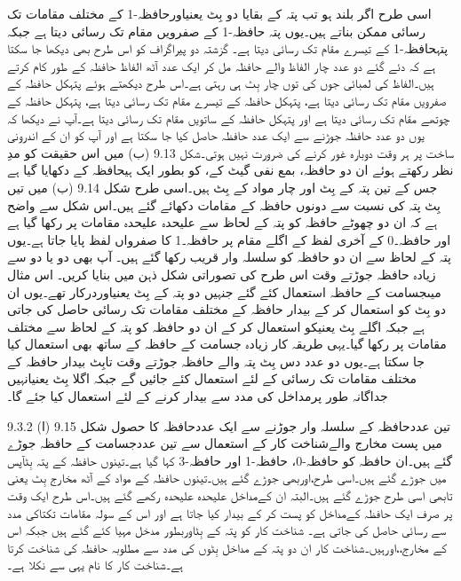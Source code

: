 	اسی طرح اگر بلند ہو تب پتہ کے بقایا دو بِٹ یعنیاورحافظہ-1 کے مختلف مقامات تک رسائی ممکن بناتے ہیں۔یوں پتہ حافظہ-1 کے صفرویں مقام تک رسائی دیتا ہے جبکہ پتہحافظہ-1 کے تیسرے مقام تک رسائی دیتا ہے۔
	گزشتہ دو پیراگراف کو اس طرح بھی دیکھا جا سکتا ہے کہ دئے گئے دو عدد چار الفاظ والے حافظہ مل کر ایک عدد آٹھ الفاظ حافظہ کے طور کام کرتے ہیں۔الفاظ کی لمبائی جوں کی توں چار بِٹ ہی رہتی ہے۔اس طرح دیکھتے ہوئے پتہکل حافظہ کے صفرویں مقام تک رسائی دیتا ہے، پتہکل حافظہ کے تیسرے مقام تک رسائی دیتا ہے، پتہکل حافظہ کے چوتھے مقام تک رسائی دیتا ہے اور پتہکل حافظہ کے ساتویں مقام تک رسائی دیتا ہے۔آپ نے دیکھا کہ یوں دو عدد حافظہ جوڑنے سے ایک عدد حافظہ حاصل کیا جا سکتا ہے اور آپ کو ان کے اندرونی ساخت پر ہر وقت دوبارہ غور کرنے کی ضرورت نہیں ہوتی۔شکل 9.13 (ب) میں اس حقیقت کو مدِ نظر رکھتے ہوئے ان دو حافظہ، بمع نفی گیٹ کے، کو بطور ایک ہیحافظہ کے دکھایا گیا ہے جس کے تین پتہ کے بِٹ اور چار مواد کے بِٹ ہیں۔اسی طرح  شکل 9.14 (ب) میں تیں بِٹ پتہ کی نسبت سے دونوں حافظہ کے مقامات دکھائے گئے ہیں۔اس شکل سے واضح ہے کہ ان دو چھوٹے حافظہ کو پتہ کے لحاظ سے علیحدہ علیحدہ مقامات پر رکھا گیا ہے اور حافظہ۔0 کے آخری لفظ کے اگلے مقام پر حافظہ۔1 کا صفرواں لفظ پایا جاتا ہے۔یوں پتہ کے لحاظ سے ان دو حافظہ کو سلسلہ وار قریب رکھا گئے ہیں۔ آپ بھی دو یا دو سے زیادہ حافظہ جوڑتے وقت اس طرح کی تصوراتی شکل ذہن میں بنایا کریں۔
	اس مثال میںجسامت کے حافظہ استعمال کئے گئے جنہیں دو پتہ کے بِٹ یعنیاوردرکار تھے۔یوں ان دو بِٹ کو استعمال کر کے بیدار حافظہ کے مختلف مقامات تک رسائی حاصل کی جاتی ہے جبکہ اگلے بِٹ یعنیکو استعمال کر کے ان دو حافظہ کو پتہ کے لحاظ سے مختلف مقامات پر رکھا گیا۔یہی طریقہ کار زیادہ جسامت کے حافظہ کے ساتھ بھی استعمال کیا جا سکتا ہے۔یوں دو عدد دس بِٹ پتہ والے حافظہ جوڑتے وقت تابِٹ بیدار حافظہ کے مختلف مقامات تک رسائی کے لئے استعمال کئے جائیں گے جبکہ اگلا بِٹ یعنیانہیں جداگانہ طور پرمداخل کی مدد سے بیدار کرنے کے لئے استعمال کیا جئے گا۔ 

9.3.2 تین عددحافظہ کے سلسلہ وار جوڑنے سے ایک عددحافظہ کا حصول
	شکل 9.15 (ا) میں پست مخارج والےشناخت کار کے استعمال سے تین عددجسامت کے حافظہ جوڑے گئے ہیں۔ان حافظہ کو حافظہ-0، حافظہ-1 اور حافظہ-3 کہا گیا ہے۔تینوں حافظہ کے پتہ بِٹآپس میں جوڑے گئے ہیں۔اسی طرح،اوربھی جوڑے گئے ہیں۔تینوں حافظہ کے مواد کے آٹھ مخارج بِٹ یعنی تابھی اسی طرح جوڑے گئے ہیں۔البتہ ان کےمداخل علیحدہ علیحدہ رکھے گئے ہیں۔اس طرح ایک وقت پر صرف ایک حافظہ کےمداخل کو پست کر کے بیدار کیا جاتا ہے اور اس کے سولہ مقامات تکتاکی مدد سے رسائی حاصل کی جاتی ہے۔
	 شناخت کار کو پتہ کے بِٹاوربطور مدخل مہیا کئے گئے ہیں جبکہ اس کے مخارج،،اورہیں۔شناخت کار ان دو پتہ کے مداخل بِٹوں کی مدد سے مطلوبہ حافظہ کی شناخت کرتا ہے۔شناخت کار کا نام یہی سے نکلا ہے۔



